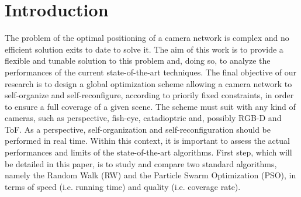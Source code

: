 \graphicspath{ {./content/intro/figure/} }

\section{Introduction}

The problem of the optimal positioning of a camera network is complex and no efficient solution exits to date to solve it. The aim of this work is to provide a flexible and tunable solution to this problem and, doing so, to analyze the performances of the current state-of-the-art techniques. The final objective of our research is to design a global optimization scheme allowing a camera network to self-organize and self-reconfigure, according to priorily fixed constraints, in order to ensure a full coverage of a given scene. The scheme must suit with any kind of cameras, such as perspective, fish-eye, catadioptric and, possibly RGB-D and ToF.  As a perspective, self-organization and self-reconfiguration should be performed in real time. Within this context, it is important to assess the actual performances and limits of the state-of-the-art algorithms. First step, which will be detailed in this paper, is to study and compare two standard algorithms, namely the Random Walk (RW) and the Particle Swarm Optimization (PSO), in terms of speed (i.e. running time) and quality (i.e. coverage rate). 

